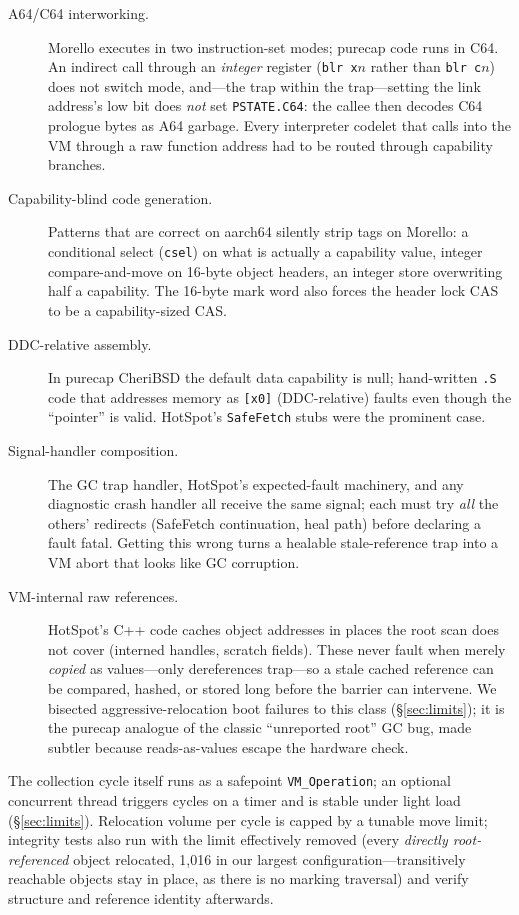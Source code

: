 \documentclass[acmsmall,nonacm,screen]{acmart}
\begin{document}
\begin{description}
\item[A64/C64 interworking.] Morello executes in two instruction-set
  modes; purecap code runs in C64. An indirect call through an
  \emph{integer} register (\texttt{blr x$n$} rather than
  \texttt{blr c$n$}) does not switch mode, and---the trap within the
  trap---setting the link address's low bit does \emph{not} set
  \texttt{PSTATE.C64}: the callee then decodes C64 prologue bytes as
  A64 garbage. Every interpreter codelet that calls into the VM through
  a raw function address had to be routed through capability branches.
\item[Capability-blind code generation.] Patterns that are correct on
  aarch64 silently strip tags on Morello: a conditional select
  (\texttt{csel}) on what is actually a capability value, integer
  compare-and-move on 16-byte object headers, an integer store
  overwriting half a capability. The 16-byte mark word also forces the
  header lock CAS to be a capability-sized CAS.
\item[DDC-relative assembly.] In purecap CheriBSD the default data
  capability is null; hand-written \texttt{.S} code that addresses
  memory as \texttt{[x0]} (DDC-relative) faults even though the
  ``pointer'' is valid. HotSpot's \texttt{SafeFetch} stubs were the
  prominent case.
\item[Signal-handler composition.] The GC trap handler, HotSpot's
  expected-fault machinery, and any diagnostic crash handler all
  receive the same signal; each must try \emph{all} the others'
  redirects (SafeFetch continuation, heal path) before declaring a
  fault fatal. Getting this wrong turns a healable stale-reference trap
  into a VM abort that looks like GC corruption.
\item[VM-internal raw references.] HotSpot's C++ code caches object
  addresses in places the root scan does not cover (interned handles,
  scratch fields). These never fault when merely \emph{copied} as
  values---only dereferences trap---so a stale cached reference can be
  compared, hashed, or stored long before the barrier can intervene.
  We bisected aggressive-relocation boot failures to this class
  (\S\ref{sec:limits}); it is the purecap analogue of the classic
  ``unreported root'' GC bug, made subtler because reads-as-values
  escape the hardware check.
\end{description}

The collection cycle itself runs as a safepoint \texttt{VM\_Operation};
an optional concurrent thread triggers cycles on a timer and is stable
under light load (\S\ref{sec:limits}). Relocation volume per cycle is
capped by a tunable move limit; integrity tests also run with the limit effectively removed (every
\emph{directly root-referenced} object relocated, 1{,}016 in our
largest configuration---transitively reachable objects stay in place,
as there is no marking traversal) and verify structure and reference
identity afterwards.
\end{document}

